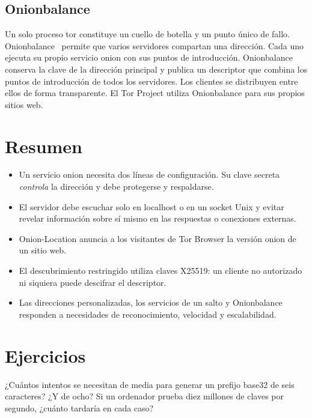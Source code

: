 \subsection{Onionbalance}

Un solo proceso tor constituye un cuello de botella y un punto único de fallo. Onionbalance~\cite{onionbalance} permite que varios servidores compartan una dirección. Cada uno ejecuta su propio servicio onion con sus puntos de introducción. Onionbalance conserva la clave de la dirección principal y publica un descriptor que combina los puntos de introducción de todos los servidores. Los clientes se distribuyen entre ellos de forma transparente. El Tor Project utiliza Onionbalance para sus propios sitios web.

\section*{Resumen}
\begin{itemize}
  \item Un servicio onion necesita dos líneas de configuración. Su clave secreta \emph{controla} la dirección y debe protegerse y respaldarse.
  \item El servidor debe escuchar solo en localhost o en un socket Unix y evitar revelar información sobre sí mismo en las respuestas o conexiones externas.
  \item Onion-Location anuncia a los visitantes de Tor Browser la versión onion de un sitio web.
  \item El descubrimiento restringido utiliza claves X25519: un cliente no autorizado ni siquiera puede descifrar el descriptor.
  \item Las direcciones personalizadas, los servicios de un salto y Onionbalance responden a necesidades de reconocimiento, velocidad y escalabilidad.
\end{itemize}

\section*{Ejercicios}

\begin{esercizio}[1]\label{es:21-vanity}
¿Cuántos intentos se necesitan de media para generar un prefijo base32 de seis caracteres? ¿Y de ocho? Si un ordenador prueba diez millones de claves por segundo, ¿cuánto tardaría en cada caso?
\end{esercizio}


